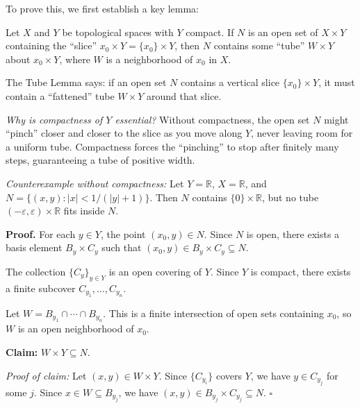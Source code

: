 \documentclass[11pt]{report}
\renewenvironment{proof}[1][Proof]{\noindent\textbf{#1.} }{\hfill$\square$\par\vspace{5pt}}
\begin{document}
To prove this, we first establish a key lemma:

\begin{lembox}
Let $X$ and $Y$ be topological spaces with $Y$ compact. If $N$ is an open set of $X \times Y$ containing the ``slice'' $x_0 \times Y = \{x_0\} \times Y$, then $N$ contains some ``tube'' $W \times Y$ about $x_0 \times Y$, where $W$ is a neighborhood of $x_0$ in $X$.
\end{lembox}

\begin{rembox}
The Tube Lemma says: if an open set $N$ contains a vertical slice $\{x_0\} \times Y$, it must contain a ``fattened'' tube $W \times Y$ around that slice.

\textit{Why is compactness of $Y$ essential?} Without compactness, the open set $N$ might ``pinch'' closer and closer to the slice as you move along $Y$, never leaving room for a uniform tube. Compactness forces the ``pinching'' to stop after finitely many steps, guaranteeing a tube of positive width.

\textit{Counterexample without compactness:} Let $Y = \mathbb{R}$, $X = \mathbb{R}$, and $N = \{(x, y) : |x| < 1/(|y|+1)\}$. Then $N$ contains $\{0\} \times \mathbb{R}$, but no tube $(-\varepsilon, \varepsilon) \times \mathbb{R}$ fits inside $N$.
\end{rembox}

\begin{proof}
For each $y \in Y$, the point $(x_0, y) \in N$. Since $N$ is open, there exists a basis element $B_y \times C_y$ such that $(x_0, y) \in B_y \times C_y \subseteq N$.

The collection $\{C_y\}_{y \in Y}$ is an open covering of $Y$. Since $Y$ is compact, there exists a finite subcover $C_{y_1}, \ldots, C_{y_n}$.

Let $W = B_{y_1} \cap \cdots \cap B_{y_n}$. This is a finite intersection of open sets containing $x_0$, so $W$ is an open neighborhood of $x_0$.

\textbf{Claim:} $W \times Y \subseteq N$.

\textit{Proof of claim:} Let $(x, y) \in W \times Y$. Since $\{C_{y_i}\}$ covers $Y$, we have $y \in C_{y_j}$ for some $j$. Since $x \in W \subseteq B_{y_j}$, we have $(x, y) \in B_{y_j} \times C_{y_j} \subseteq N$.
\end{proof}
\end{document}
